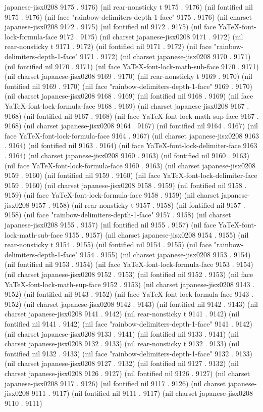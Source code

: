 japanese-jisx0208 9175 . 9176) (nil rear-nonsticky t 9175 . 9176) (nil fontified nil 9175 . 9176) (nil face "rainbow-delimiters-depth-1-face" 9175 . 9176) (nil charset japanese-jisx0208 9172 . 9175) (nil fontified nil 9172 . 9175) (nil face YaTeX-font-lock-formula-face 9172 . 9175) (nil charset japanese-jisx0208 9171 . 9172) (nil rear-nonsticky t 9171 . 9172) (nil fontified nil 9171 . 9172) (nil face "rainbow-delimiters-depth-1-face" 9171 . 9172) (nil charset japanese-jisx0208 9170 . 9171) (nil fontified nil 9170 . 9171) (nil face YaTeX-font-lock-math-sub-face 9170 . 9171) (nil charset japanese-jisx0208 9169 . 9170) (nil rear-nonsticky t 9169 . 9170) (nil fontified nil 9169 . 9170) (nil face "rainbow-delimiters-depth-1-face" 9169 . 9170) (nil charset japanese-jisx0208 9168 . 9169) (nil fontified nil 9168 . 9169) (nil face YaTeX-font-lock-formula-face 9168 . 9169) (nil charset japanese-jisx0208 9167 . 9168) (nil fontified nil 9167 . 9168) (nil face YaTeX-font-lock-math-sup-face 9167 . 9168) (nil charset japanese-jisx0208 9164 . 9167) (nil fontified nil 9164 . 9167) (nil face YaTeX-font-lock-formula-face 9164 . 9167) (nil charset japanese-jisx0208 9163 . 9164) (nil fontified nil 9163 . 9164) (nil face YaTeX-font-lock-delimiter-face 9163 . 9164) (nil charset japanese-jisx0208 9160 . 9163) (nil fontified nil 9160 . 9163) (nil face YaTeX-font-lock-formula-face 9160 . 9163) (nil charset japanese-jisx0208 9159 . 9160) (nil fontified nil 9159 . 9160) (nil face YaTeX-font-lock-delimiter-face 9159 . 9160) (nil charset japanese-jisx0208 9158 . 9159) (nil fontified nil 9158 . 9159) (nil face YaTeX-font-lock-formula-face 9158 . 9159) (nil charset japanese-jisx0208 9157 . 9158) (nil rear-nonsticky t 9157 . 9158) (nil fontified nil 9157 . 9158) (nil face "rainbow-delimiters-depth-1-face" 9157 . 9158) (nil charset japanese-jisx0208 9155 . 9157) (nil fontified nil 9155 . 9157) (nil face YaTeX-font-lock-math-sub-face 9155 . 9157) (nil charset japanese-jisx0208 9154 . 9155) (nil rear-nonsticky t 9154 . 9155) (nil fontified nil 9154 . 9155) (nil face "rainbow-delimiters-depth-1-face" 9154 . 9155) (nil charset japanese-jisx0208 9153 . 9154) (nil fontified nil 9153 . 9154) (nil face YaTeX-font-lock-formula-face 9153 . 9154) (nil charset japanese-jisx0208 9152 . 9153) (nil fontified nil 9152 . 9153) (nil face YaTeX-font-lock-math-sup-face 9152 . 9153) (nil charset japanese-jisx0208 9143 . 9152) (nil fontified nil 9143 . 9152) (nil face YaTeX-font-lock-formula-face 9143 . 9152) (nil charset japanese-jisx0208 9142 . 9143) (nil fontified nil 9142 . 9143) (nil charset japanese-jisx0208 9141 . 9142) (nil rear-nonsticky t 9141 . 9142) (nil fontified nil 9141 . 9142) (nil face "rainbow-delimiters-depth-1-face" 9141 . 9142) (nil charset japanese-jisx0208 9133 . 9141) (nil fontified nil 9133 . 9141) (nil charset japanese-jisx0208 9132 . 9133) (nil rear-nonsticky t 9132 . 9133) (nil fontified nil 9132 . 9133) (nil face "rainbow-delimiters-depth-1-face" 9132 . 9133) (nil charset japanese-jisx0208 9127 . 9132) (nil fontified nil 9127 . 9132) (nil charset japanese-jisx0208 9126 . 9127) (nil fontified nil 9126 . 9127) (nil charset japanese-jisx0208 9117 . 9126) (nil fontified nil 9117 . 9126) (nil charset japanese-jisx0208 9111 . 9117) (nil fontified nil 9111 . 9117) (nil charset japanese-jisx0208 9110 . 9111) 